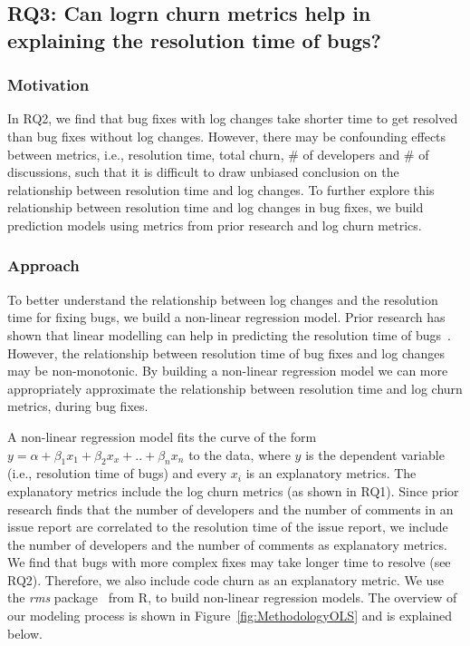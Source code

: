 \subsection*{RQ3: Can logrn churn metrics help in explaining the resolution time of bugs?} 

\subsubsection*{Motivation}

In RQ2, we find that bug fixes with log changes take shorter time to get resolved than bug fixes without log changes. However, there may be confounding effects between metrics, i.e., resolution time, total churn, \# of developers and \# of discussions, such that it is difficult to draw unbiased conclusion on the relationship between resolution time and log changes. To further explore this relationship between resolution time and log changes in bug fixes, we build prediction models using metrics from prior research and log churn metrics. %

\subsubsection*{Approach}

To better understand the relationship between log changes and the resolution time for fixing bugs, we build a non-linear regression model. Prior research has shown that linear modelling can help in predicting the resolution time of bugs~\cite{anbalagan2009predicting}. However, the relationship between resolution time of bug fixes and log changes may be non-monotonic. By building a non-linear regression model we can more appropriately approximate the relationship between resolution time and log churn metrics, during bug fixes.

A non-linear regression model fits the curve of the form $y = \alpha + \beta_{1}x_{1} + \beta_{2}x_{x} + .. + \beta_{n}x_{n} $ to the data, where $y$ is the dependent variable (i.e., resolution time of bugs) and every $x_{i}$ is an explanatory metrics. The explanatory metrics include the log churn metrics (as shown in RQ1). Since prior research finds that the number of developers and the number of comments in an issue report are correlated to the resolution time of the issue report, we include the number of developers and the number of comments as explanatory metrics. We find that bugs with more complex fixes may take longer time to resolve (see RQ2). Therefore, we also include code churn as an explanatory metric. We use the \textsl{rms} package~\cite{rmsPackage} from R, to build non-linear regression models. The overview of our modeling process is shown in Figure~\ref{fig:MethodologyOLS} and is explained below. 




